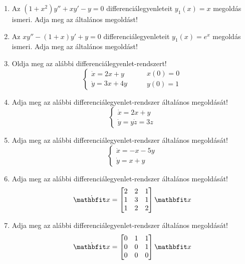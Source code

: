 \documentclass{szb-practice}
\begin{document}
\begin{enumerate}
  \item Az $(1 + x^2) y'' + xy' - y = 0$ differenciálegyenleteit
        $y_1(x) = x$ megoldás ismeri. Adja meg az általános megoldást!

  \item Az $xy'' - (1 + x) y' + y = 0$ differenciálegyenleteit
        $y_1(x) = e^x$ megoldás ismeri. Adja meg az általános megoldást!

  \item Oldja meg az alábbi differenciálegyenlet-rendszert!
        $$
          \left\{
          \begin{array}{l}
            \dot x = 2x + y \\
            \dot y = 3x + 4y
          \end{array}
          \right.
          \qquad
          \begin{array}{l}
            x(0) = 0 \\
            y(0) = 1
          \end{array}
        $$

  \item Adja meg az alábbi differenciálegyenlet-rendszer általános megoldását!
        $$
          \left\{
          \begin{array}{l}
            \dot x = 2x + y \\
            \dot y = y
            \dot z = 3z
          \end{array}
          \right.
        $$

  \item Adja meg az alábbi differenciálegyenlet-rendszer általános megoldását!
        $$
          \left\{
          \begin{array}{l}
            \dot x = -x - 5y \\
            \dot y = x + y
          \end{array}
          \right.
        $$

  \item Adja meg az alábbi differenciálegyenlet-rendszer általános megoldását!
        $$
          \dot{\rvec x} = \begin{bmatrix}
            2 & 2 & 1 \\
            1 & 3 & 1 \\
            1 & 2 & 2 \\
          \end{bmatrix} \rvec x
        $$

  \item Adja meg az alábbi differenciálegyenlet-rendszer általános megoldását!
        $$
          \dot{\rvec x} = \begin{bmatrix}
            0 & 1 & 1 \\
            0 & 0 & 1 \\
            0 & 0 & 0 \\
          \end{bmatrix} \rvec x
        $$


\end{enumerate}
\end{document}
